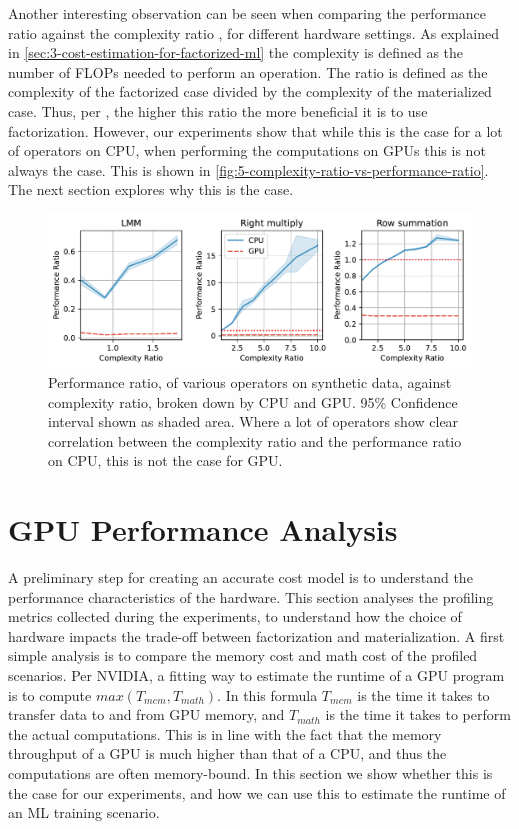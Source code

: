 Another interesting observation can be seen when comparing the performance ratio against the complexity ratio \cite{schijndel_cost_estimation}, for different hardware settings. As explained in \autoref{sec:3-cost-estimation-for-factorized-ml} the complexity is defined as the number of FLOPs needed to perform an operation. The ratio is defined as the complexity of the factorized case divided by the complexity of the materialized case. Thus, per \cite{schijndel_cost_estimation}, the higher this ratio the more beneficial it is to use factorization. However, our experiments show that while this is the case for a lot of operators on CPU, when performing the computations on GPUs this is not always the case. This is shown in \autoref{fig:5-complexity-ratio-vs-performance-ratio}. The next section explores why this is the case.

\begin{figure}[ht]
    \centering
    \includegraphics[width=\linewidth]{chapters/05_cost_estimation/figures/motivation_speedup_complexity_ratio.pdf}
    \caption[Performance ratio plotted against complexity ratio]{Performance ratio, of various operators on synthetic data, against complexity ratio, broken down by CPU and GPU. 95\% Confidence interval shown as shaded area. Where a lot of operators show clear correlation between the complexity ratio and the performance ratio on CPU, this is not the case for GPU.}
    \label{fig:5-complexity-ratio-vs-performance-ratio}
\end{figure}


\section{GPU Performance Analysis}
\label{sec:5-gpu-performance-analysis}
A preliminary step for creating an accurate cost model is to understand the performance characteristics of the hardware. This section analyses the profiling metrics collected during the experiments, to understand how the choice of hardware impacts the trade-off between factorization and materialization. A first simple analysis is to compare the memory cost and math cost of the profiled scenarios. Per NVIDIA, a fitting way to estimate the runtime of a GPU program is to compute $max(T_{mem}, T_{math})$. In this formula $T_{mem}$ is the time it takes to transfer data to and from GPU memory, and $T_{math}$ is the time it takes to perform the actual computations. This is in line with the fact that the memory throughput of a GPU is much higher than that of a CPU, and thus the computations are often memory-bound. In this section we show whether this is the case for our experiments, and how we can use this to estimate the runtime of an ML training scenario.


